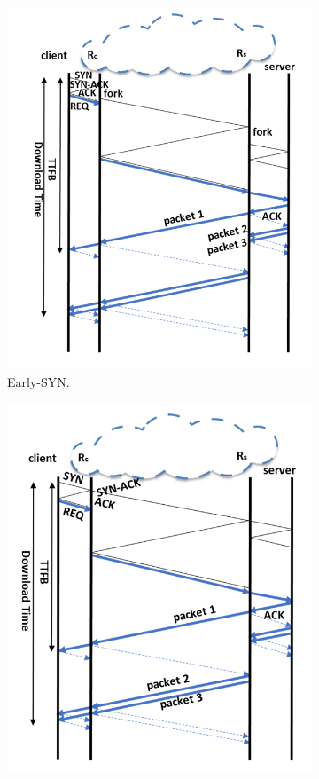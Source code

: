 \begin{figure}[!t]
  \centering
    \begin{subfigure}{0.75\columnwidth}
  \centering
  \includegraphics[width=\columnwidth]{figures/early-syn.png}
    \caption{Early-SYN.}
    \label{fig:early-syn}
\end{subfigure}    \hfill
\begin{subfigure}{0.75\columnwidth}
  \centering
  \includegraphics[width=\columnwidth]{figures/thread.png}

\end{subfigure}
\end{figure}
